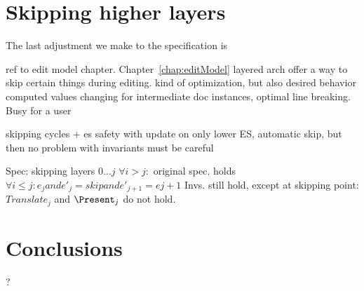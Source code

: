 \section{Skipping higher layers} \label{sect:specSkipLayers}

The last adjustment we make to the specification is 

\bl
\* ref to edit model chapter. Chapter~\ref{chap:editModel}
\* layered arch offer a way to skip certain things during editing.
\* kind of optimization, but also desired behavior
\* computed values changing for intermediate doc instances, optimal line breaking. Busy for a user 
\el

\bl
\* skipping cycles + es safety
\* with update on only lower ES, automatic skip, but then no problem with invariants
\* must be careful
\el

Spec:
\bl
\* skipping layers $0\dots j$
\* $\forall i>j:$ original spec. holds
\* $\forall i\le j: e_j and e'_j = skip and e'_{j+1} = e{j+1}$  
\* Invs. still hold, except at skipping point: $Translate_j$ and $\Present_j$ do not hold.
\el

\section{Conclusions}

\bl
\* ?
\el




